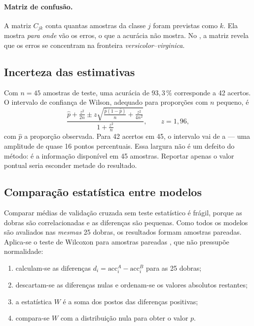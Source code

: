 \paragraph{Matriz de confusão.} A matriz $C_{jk}$ conta quantas amostras da classe $j$ foram
previstas como $k$. Ela mostra \emph{para onde} vão os erros, o que a acurácia não mostra. No
, a matriz revela que os erros se concentram na fronteira
\emph{versicolor}--\emph{virginica}.

\subsection{Incerteza das estimativas}

Com $n=45$ amostras de teste, uma acurácia de $93{,}3\,\%$ corresponde a 42 acertos. O intervalo de
confiança de Wilson, adequado para proporções com $n$ pequeno, é
\begin{equation}
	\frac{\hat{p} + \frac{z^2}{2n} \pm z\sqrt{\frac{\hat{p}(1-\hat{p})}{n} + \frac{z^2}{4n^2}}}{1+\frac{z^2}{n}},
	\qquad z = 1{,}96,
	\label{eq:wilson}
\end{equation}
com $\hat{p}$ a proporção observada. Para 42 acertos em 45, o intervalo vai de \icLo{} a \icHi{} ---
uma amplitude de quase 16 pontos percentuais. Essa largura não é um defeito do método: é a
informação disponível em 45 amostras. Reportar apenas o valor pontual seria esconder metade do
resultado.

\subsection{Comparação estatística entre modelos}

Comparar médias de validação cruzada sem teste estatístico é frágil, porque as dobras são
correlacionadas e as diferenças são pequenas. Como todos os modelos são avaliados nas
\emph{mesmas} 25 dobras, os resultados formam amostras pareadas. Aplica-se o teste de Wilcoxon
para amostras pareadas \cite{dietterich1998}, que não pressupõe normalidade:

\begin{enumerate}
	\item calculam-se as diferenças $d_i = \text{acc}_i^{A} - \text{acc}_i^{B}$ para as 25 dobras;
	\item descartam-se as diferenças nulas e ordenam-se os valores absolutos restantes;
	\item a estatística $W$ é a soma dos postos das diferenças positivas;
	\item compara-se $W$ com a distribuição nula para obter o valor $p$.
\end{enumerate}

